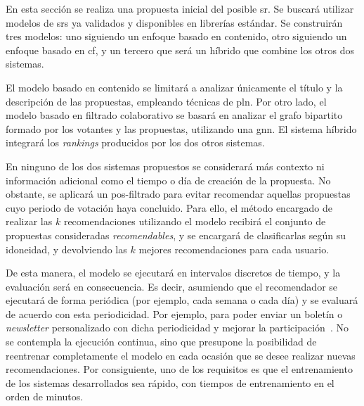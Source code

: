 En esta sección se realiza una propuesta inicial del posible \gls{sr}. Se buscará utilizar modelos de \glspl{sr} ya validados y disponibles en librerías estándar. Se construirán tres modelos: uno siguiendo un enfoque basado en contenido, otro siguiendo un enfoque basado en \gls{cf}, y un tercero que será un híbrido que combine los otros dos sistemas.

El modelo basado en contenido se limitará a analizar únicamente el título y la descripción de las propuestas, empleando técnicas de \gls{pln}. Por otro lado, el modelo basado en filtrado colaborativo se basará en analizar el grafo bipartito formado por los votantes y las propuestas, utilizando una \gls{gnn}. El sistema híbrido integrará los \textit{rankings} producidos por los dos otros sistemas.

En ninguno de los dos sistemas propuestos se considerará más contexto ni información adicional como el tiempo o día de creación de la propuesta. No obstante, se aplicará un pos-filtrado para evitar recomendar aquellas propuestas cuyo periodo de votación haya concluido. Para ello, el método encargado de realizar las $k$ recomendaciones utilizando el modelo recibirá el conjunto de propuestas consideradas \textit{recomendables}, y se encargará de clasificarlas según su idoneidad, y devolviendo las $k$ mejores recomendaciones para cada usuario.

De esta manera, el modelo se ejecutará en intervalos discretos de tiempo, y la evaluación será en consecuencia. Es decir, asumiendo que el recomendador se ejecutará de forma periódica (por ejemplo, cada semana o cada día) y se evaluará de acuerdo con esta periodicidad. Por ejemplo, para poder enviar un boletín o \textit{newsletter} personalizado con dicha periodicidad y mejorar la participación~\cite{maslowska_effectiveness_2011}. No se contempla la ejecución continua, sino que presupone la posibilidad de reentrenar completamente el modelo en cada ocasión que se desee realizar nuevas recomendaciones. Por consiguiente, uno de los requisitos es que el entrenamiento de los sistemas desarrollados sea rápido, con tiempos de entrenamiento en el orden de minutos.
